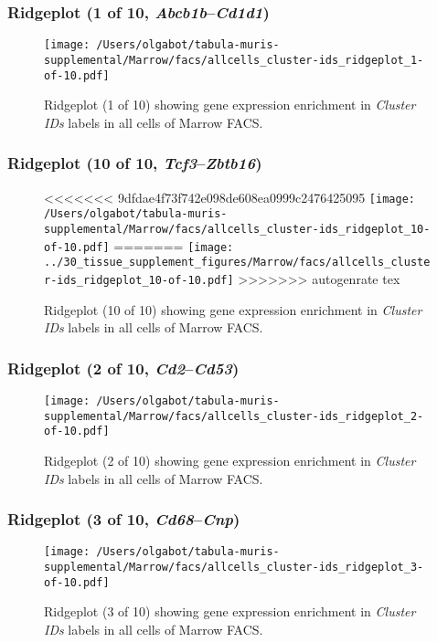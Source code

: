 \clearpage

\subsubsection{Ridgeplot (1 of 10, \emph{Abcb1b}--\emph{Cd1d1})}
\begin{figure}[h]
\centering
\texttt{[image: /Users/olgabot/tabula-muris-supplemental/Marrow/facs/allcells\_cluster-ids\_ridgeplot\_1-of-10.pdf]}

\caption{ Ridgeplot (1 of 10)  showing gene expression enrichment in \emph{Cluster IDs} labels in all cells of Marrow FACS. }
\end{figure}


\clearpage

\subsubsection{Ridgeplot (10 of 10, \emph{Tcf3}--\emph{Zbtb16})}
\begin{figure}[h]
\centering
<<<<<<< 9dfdae4f73f742e098de608ea0999c2476425095
\texttt{[image: /Users/olgabot/tabula-muris-supplemental/Marrow/facs/allcells\_cluster-ids\_ridgeplot\_10-of-10.pdf]}
=======
\texttt{[image: ../30\_tissue\_supplement\_figures/Marrow/facs/allcells\_cluster-ids\_ridgeplot\_10-of-10.pdf]}
>>>>>>> autogenrate tex

\caption{ Ridgeplot (10 of 10)  showing gene expression enrichment in \emph{Cluster IDs} labels in all cells of Marrow FACS. }
\end{figure}


\clearpage

\subsubsection{Ridgeplot (2 of 10, \emph{Cd2}--\emph{Cd53})}
\begin{figure}[h]
\centering
\texttt{[image: /Users/olgabot/tabula-muris-supplemental/Marrow/facs/allcells\_cluster-ids\_ridgeplot\_2-of-10.pdf]}

\caption{ Ridgeplot (2 of 10)  showing gene expression enrichment in \emph{Cluster IDs} labels in all cells of Marrow FACS. }
\end{figure}


\clearpage

\subsubsection{Ridgeplot (3 of 10, \emph{Cd68}--\emph{Cnp})}
\begin{figure}[h]
\centering
\texttt{[image: /Users/olgabot/tabula-muris-supplemental/Marrow/facs/allcells\_cluster-ids\_ridgeplot\_3-of-10.pdf]}

\caption{ Ridgeplot (3 of 10)  showing gene expression enrichment in \emph{Cluster IDs} labels in all cells of Marrow FACS. }
\end{figure}


